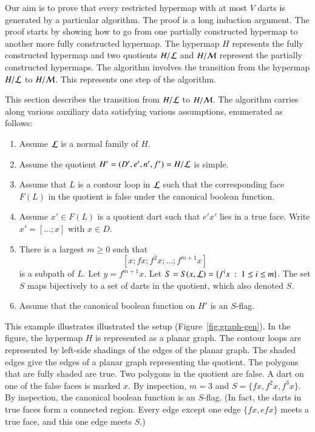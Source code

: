 Our aim is to prove that every restricted hypermap with at most $V$ darts is generated by a particular algorithm.  The proof is a long induction argument.  The proof starts by showing how to go from one partially constructed hypermap to another more fully constructed hypermap.  The hypermap $H$ represents the fully constructed hypermap and two quotients $H/{\cal L}$ and $H/{\cal M}$ represent the partially constructed hypermaps.  The algorithm involves the transition from the hypermap $H/{\cal L}$ to $H/{\cal M}$.  This represents one step of the algorithm.

This section describes the transition from $H/{\cal L}$ to $H/{\cal M}$.  The algorithm carries along various auxiliary data satisfying various assumptions, enumerated as follows:

\begin{remark}[context]\label{enum:context}
\begin{enumerate}
\item Assume $\cal L$ is a normal family of $H$.
\item Assume the quotient $H'=(D',e',n',f')=H/{\cal L}$ is simple.  
\item Assume that $L$ is a contour loop in ${\cal L}$ such that the corresponding face $F(L)$ in the quotient is false under the canonical boolean function.
\item Assume $x'\in F(L)$ is a quotient dart such that $e'x'$ lies in a true face.  Write $x' = [\ldots;x]$ with $x\in D$. 
\item There is a largest $m\ge0$ such that 
$$
[x;f x; f^2 x;\ldots;f^{m+1} x]
$$  
is a subpath of $L$.
Let $y = f^{m+1} x$.  Let $S = S(x,{\cal L}) = \{f^i x \mid 1 \le i\le m\}$.   The set $S$ maps bijectively to a set of darts in the quotient, which also denoted  $S$. 
\item Assume that the canonical boolean function on $H'$ is an $S$-flag.
\end{enumerate}
\end{remark}

  


\begin{example}\label{ex:graph-gen}  This example illustrates illustrated the setup (Figure~\ref{fig:graph-gen}).   In the figure, the hypermap $H$ is represented as a planar graph.
The contour loops are represented by left-side shadings of the edges of the
planar graph.  The shaded edges give the edges of a planar graph representing the quotient.  The polygons that are fully shaded are true.   Two polygons in the quotient are false.  A dart on one of the false faces is marked $x$.  By inspection, $m=3$ and $S=\{f x,f^2 x,f^3 x\}$.  By inspection, the canonical boolean function is an $S$-flag.  (In fact, the darts in true faces form a connected region.  Every edge except one edge $\{f x, e f x\}$ meets a true face, and this one edge meets $S$.)
\end{example}

